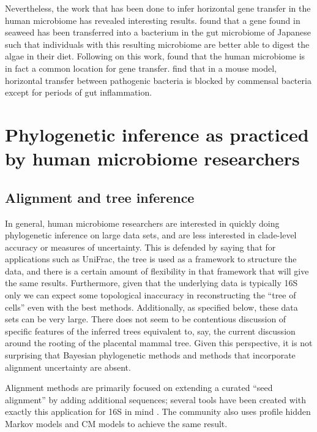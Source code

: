 \documentclass{amsart}
\begin{document}
Nevertheless, the work that has been done to infer horizontal gene transfer in the human microbiome has revealed interesting results.
\citet{hehemann2010transfer} found that a gene found in seaweed has been transferred into a bacterium in the gut microbiome of Japanese such that individuals with this resulting microbiome are better able to digest the algae in their diet.
Following on this work, \citet{smillie2011ecology} found that the human microbiome is in fact a common location for gene transfer.
\citet{stecher2012gut} find that in a mouse model, horizontal transfer between pathogenic bacteria is blocked by commensal bacteria except for periods of gut inflammation.


\section{Phylogenetic inference as practiced by human microbiome researchers}

\subsection{Alignment and tree inference}
In general, human microbiome researchers are interested in quickly doing phylogenetic inference on large data sets, and are less interested in clade-level accuracy or measures of uncertainty.
This is defended by saying that for applications such as UniFrac, the tree is used as a framework to structure the data, and there is a certain amount of flexibility in that framework that will give the same results.
Furthermore, given that the underlying data is typically 16S only we can expect some topological inaccuracy in reconstructing the ``tree of cells'' even with the best methods.
Additionally, as specified below, these data sets can be very large.
There does not seem to be contentious discussion of specific features of the inferred trees equivalent to, say, the current discussion around the rooting of the placental mammal tree.
Given this perspective, it is not surprising that Bayesian phylogenetic methods and methods that incorporate alignment uncertainty are absent.

Alignment methods are primarily focused on extending a curated ``seed alignment'' by adding additional sequences; several tools have been created with exactly this application for 16S in mind \citep{desantis2006nast,caporaso2010pynast,pruesse2012sina}.
The community also uses profile hidden Markov models \citep{eddy1998profile} and CM models \citep{nawrocki2009infernal,nawrocki2009structural} to achieve the same result.
\end{document}
